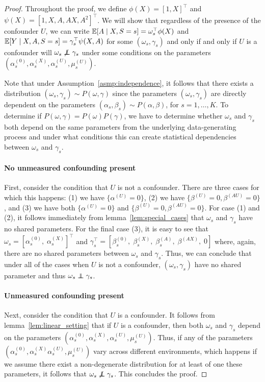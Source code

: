 \documentclass{article}
\begin{document}
\begin{proof} 
Throughout the proof, we define $\phi(X)=[1,X]^\top$ and $\psi(X)=[1,X, A, AX, A^2]^\top$. We will show that regardless of the presence of the confounder $U$, we can write $\mathbb{E}[A\mid X,S=s]=\omega_s^\top\phi(X)$ and $\mathbb{E}[Y\mid X, A, S=s] = \gamma_s^\top\psi(X,A)$ for some $(\omega_s, \gamma_s)$ and only if and only if $U$ is a confounder will $\omega_s \not\indep \gamma_s$ under some conditions on the parameters $(\alpha_{s}^{(0)}, \alpha_{s}^{(X)}, \alpha_{s}^{(U)},\mu_{s}^{(U)})$.

Note that under Assumption~\ref*{asmp:independence}, it follows that there exists a distribution $(\omega_s, \gamma_s)\sim P(\omega, \gamma)$ since the parameters $(\omega_s, \gamma_s)$ are directly dependent on the parameters $(\alpha_s,\beta_s)\sim P(\alpha, \beta)$, for $s=1,\dots,K$. To determine if $P(\omega, \gamma)=P(\omega)P(\gamma)$, we  have to determine whether $\omega_s$ and $\gamma_s$ both depend on the same parameters from the underlying data-generating process and under what conditions this can create statistical dependencies between $\omega_s$ and $\gamma_s$. 

\paragraph{No unmeasured confounding present} First,  consider the condition that $U$ is not a confounder. There are three cases for which this happens: (1) we have $\{\alpha^{(U)} = 0\}$, (2) we have $\{\beta^{(U)}=0, \beta^{(AU)}=0\}$, and (3) we have both  $\{\alpha^{(U)} = 0\}$ and $\{\beta^{(U)}=0, \beta^{(AU)}=0\}$. For case (1) and (2), it follows immediately from lemma~\ref{lem:special_cases} that $\omega_s$ and $\gamma_s$ have no shared parameters. For the final case (3), it is easy to see that $\omega_s=[\alpha_{s}^{(0)},\;\alpha_{s}^{(X)}]^\top$ and $\gamma_s^\top=[\beta_{s}^{(0)},\;\beta_{s}^{(X)},\;\beta_{s}^{(A)},\;\beta^{(AX)},\; 0]$ where, again, there are no shared parameters between $\omega_s$ and $\gamma_s$. Thus, we can conclude that under all of the cases when $U$ is not a confounder, $(\omega_s,\gamma_s)$ have no shared parameter and thus $\omega_s \indep \gamma_s$.

\paragraph{Unmeasured confounding present} Next, consider the condition that $U$ is a confounder. It follows from lemma~\ref{lem:linear_setting} that if $U$ is a confounder, then both $\omega_s$ and $\gamma_s$ depend on the parameters $(\alpha_{s}^{(0)}, \alpha_{s}^{(X)}, \alpha_{s}^{(U)},\mu_{s}^{(U)})$. Thus, if any of the parameters $(\alpha_{s}^{(0)}, \alpha_{s}^{(X)}\alpha_{s}^{(U)},\mu_{s}^{(U)})$ vary across different environments, which happens if we assume there exist a non-degenerate distribution for at least of one these parameters, it follows that $\omega_s \not\indep \gamma_s$. This concludes the proof.
\end{proof}
\end{document}
